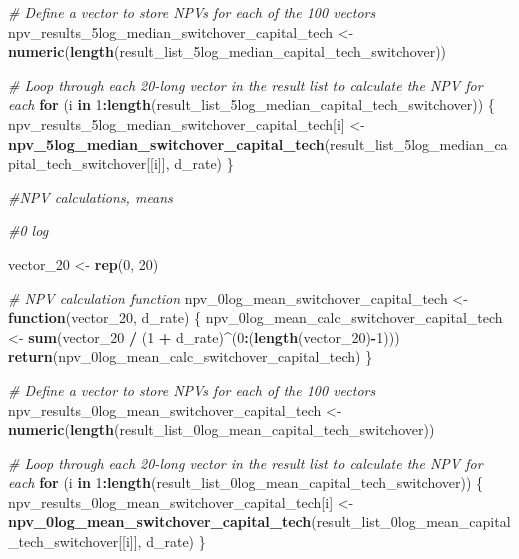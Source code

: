 \documentclass[
]{article}
\newenvironment{Shaded}{\begin{snugshade}}{\end{snugshade}}
\newcommand{\CommentTok}[1]{\textcolor[rgb]{0.56,0.35,0.01}{\textit{#1}}}
\newcommand{\ControlFlowTok}[1]{\textcolor[rgb]{0.13,0.29,0.53}{\textbf{#1}}}
\newcommand{\DecValTok}[1]{\textcolor[rgb]{0.00,0.00,0.81}{#1}}
\newcommand{\FunctionTok}[1]{\textcolor[rgb]{0.13,0.29,0.53}{\textbf{#1}}}
\newcommand{\NormalTok}[1]{#1}
\newcommand{\OtherTok}[1]{\textcolor[rgb]{0.56,0.35,0.01}{#1}}
\newcommand{\SpecialCharTok}[1]{\textcolor[rgb]{0.81,0.36,0.00}{\textbf{#1}}}
\begin{document}
\begin{Shaded}
\begin{Highlighting}[]
\CommentTok{\# Define a vector to store NPVs for each of the 100 vectors}
\NormalTok{npv\_results\_5log\_median\_switchover\_capital\_tech }\OtherTok{\textless{}{-}} \FunctionTok{numeric}\NormalTok{(}\FunctionTok{length}\NormalTok{(result\_list\_5log\_median\_capital\_tech\_switchover))}

\CommentTok{\# Loop through each 20{-}long vector in the result list to calculate the NPV for each}
\ControlFlowTok{for}\NormalTok{ (i }\ControlFlowTok{in} \DecValTok{1}\SpecialCharTok{:}\FunctionTok{length}\NormalTok{(result\_list\_5log\_median\_capital\_tech\_switchover)) \{}
\NormalTok{  npv\_results\_5log\_median\_switchover\_capital\_tech[i] }\OtherTok{\textless{}{-}} \FunctionTok{npv\_5log\_median\_switchover\_capital\_tech}\NormalTok{(result\_list\_5log\_median\_capital\_tech\_switchover[[i]], d\_rate)}
\NormalTok{\}}



\CommentTok{\#NPV calculations, means}


\CommentTok{\#0 log }

\NormalTok{vector\_20 }\OtherTok{\textless{}{-}} \FunctionTok{rep}\NormalTok{(}\DecValTok{0}\NormalTok{, }\DecValTok{20}\NormalTok{)}

\CommentTok{\# NPV calculation function}
\NormalTok{npv\_0log\_mean\_switchover\_capital\_tech }\OtherTok{\textless{}{-}} \ControlFlowTok{function}\NormalTok{(vector\_20, d\_rate) \{}
\NormalTok{  npv\_0log\_mean\_calc\_switchover\_capital\_tech }\OtherTok{\textless{}{-}} \FunctionTok{sum}\NormalTok{(vector\_20 }\SpecialCharTok{/}\NormalTok{ (}\DecValTok{1} \SpecialCharTok{+}\NormalTok{ d\_rate)}\SpecialCharTok{\^{}}\NormalTok{(}\DecValTok{0}\SpecialCharTok{:}\NormalTok{(}\FunctionTok{length}\NormalTok{(vector\_20)}\SpecialCharTok{{-}}\DecValTok{1}\NormalTok{)))}
  \FunctionTok{return}\NormalTok{(npv\_0log\_mean\_calc\_switchover\_capital\_tech)}
\NormalTok{\}}

\CommentTok{\# Define a vector to store NPVs for each of the 100 vectors}
\NormalTok{npv\_results\_0log\_mean\_switchover\_capital\_tech }\OtherTok{\textless{}{-}} \FunctionTok{numeric}\NormalTok{(}\FunctionTok{length}\NormalTok{(result\_list\_0log\_mean\_capital\_tech\_switchover))}

\CommentTok{\# Loop through each 20{-}long vector in the result list to calculate the NPV for each}
\ControlFlowTok{for}\NormalTok{ (i }\ControlFlowTok{in} \DecValTok{1}\SpecialCharTok{:}\FunctionTok{length}\NormalTok{(result\_list\_0log\_mean\_capital\_tech\_switchover)) \{}
\NormalTok{  npv\_results\_0log\_mean\_switchover\_capital\_tech[i] }\OtherTok{\textless{}{-}} \FunctionTok{npv\_0log\_mean\_switchover\_capital\_tech}\NormalTok{(result\_list\_0log\_mean\_capital\_tech\_switchover[[i]], d\_rate)}
\NormalTok{\}}




\end{Highlighting}
\end{Shaded}
\end{document}
